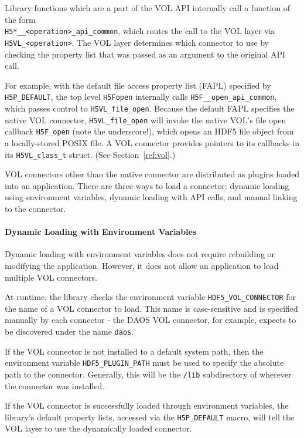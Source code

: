 Library functions which are a part of the VOL API internally call a function of the form \\ \texttt{H5*\_\_<operation>\_api\_common}, which routes the call to the VOL layer via \texttt{H5VL\_<operation>}. The VOL layer determines which connector to use by checking the property list that was passed as an argument to the original API call.

For example, with the default file access property list (FAPL) specified by \texttt{H5P\_DEFAULT}, the top level \texttt{H5Fopen} internally calls \texttt{H5F\_\_open\_api\_common}, which passes control to \texttt{H5VL\_file\_open}. Because the default FAPL specifies the native VOL connector, \texttt{H5VL\_file\_open} will invoke the native VOL's file open callback \texttt{H5F\_open} (note the underscore!), which opens an HDF5 file object from a locally-stored POSIX file. A VOL connector provides pointers to its callbacks in its \texttt{H5VL\_class\_t} struct. (See Section~\ref{ref:vol}.)

VOL connectors other than the native connector are distributed as plugins loaded into an application. There are three ways to load a connector: dynamic loading using environment variables, dynamic loading with API calls, and manual linking to the connector.

\paragraph{Dynamic Loading with Environment Variables} Dynamic loading with environment variables does not require rebuilding or modifying the application. However, it does not allow an application to load multiple VOL connectors.

At runtime, the library checks the environment variable \texttt{HDF5\_VOL\_CONNECTOR} for the name of a VOL connector to load. This name is case-sensitive and is specified manually by each connector - the DAOS VOL connector, for example, expects to be discovered under the name \texttt{daos}. 

If the VOL connector is not installed to a default system path, then the environment variable \texttt{HDF5\_PLUGIN\_PATH} must be used to specify the absolute path to the connector. Generally, this will be the \texttt{/lib} subdirectory of wherever the connector was installed.

If the VOL connector is successfully loaded through environment variables, the library's default property lists, accessed via the \texttt{H5P\_DEFAULT} macro, will tell the VOL layer to use the dynamically loaded connector.

